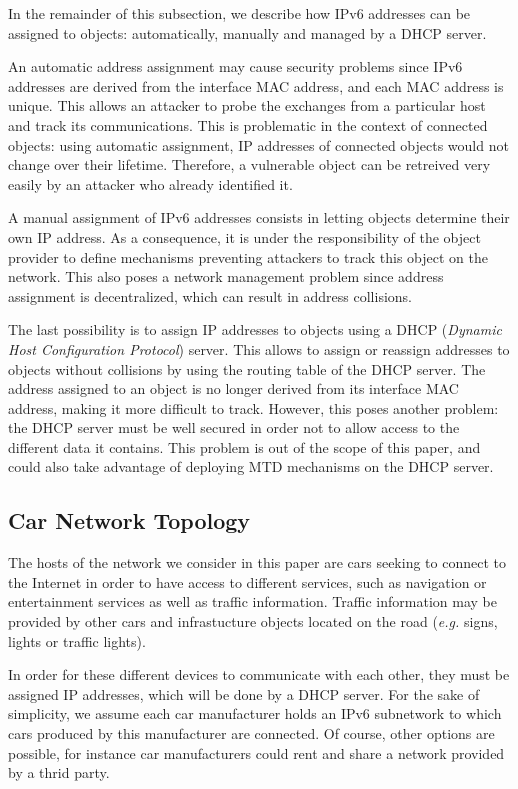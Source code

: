 In the remainder of this subsection, we describe how IPv6 addresses
can be assigned to objects: automatically, manually and managed by a
DHCP server.

An automatic address assignment may cause security problems since IPv6
addresses are derived from the interface MAC address, and each MAC
address is unique. This allows an attacker to probe the exchanges from
a particular host and track its communications. This is problematic
in the context of connected objects: using automatic assignment, IP
addresses of connected objects would not change over their
lifetime. Therefore, a vulnerable object can be retreived very easily
by an attacker who already identified it.

A manual assignment of IPv6 addresses consists in letting objects
determine their own IP address. As a consequence, it is under the
responsibility of the object provider to define mechanisms preventing
attackers to track this object on the network. This also poses a
network management problem since address assignment is decentralized,
which can result in address collisions.

The last possibility is to assign IP addresses to objects using a DHCP (\emph{Dynamic Host Configuration Protocol})
server. This allows to assign or reassign addresses to objects
without collisions by using the routing table of the DHCP server. The
address assigned to an object is no longer derived from its interface
MAC address, making it more difficult to track. However, this poses
another problem: the DHCP server must be well secured in order not to
allow access to the different data it contains. This problem is out of
the scope of this paper, and could also take advantage of deploying
MTD mechanisms on the DHCP server.


\subsection {Car Network Topology}

The hosts of the network we consider in this paper are cars seeking
to connect to the Internet in order to have access to different
services, such as navigation or entertainment services as well as
traffic information. Traffic information may be provided by other cars
and infrastucture objects located on the road (\emph{e.g.} signs,
lights or traffic lights).

In order for these different devices to communicate with each other,
they must be assigned IP addresses, which will be done by a DHCP
server. For the sake of simplicity, we assume each car manufacturer
holds an IPv6 subnetwork to which cars produced by this manufacturer
are connected. Of course, other options are possible, for instance car
manufacturers could rent and share a network provided by a thrid
party.

